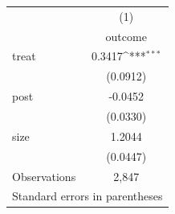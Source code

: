{
\def\sym#1{\ifmmode^{#1}\else\(^{#1}\)\fi}
\begin{tabular}{l*{1}{c}}
\toprule
                    &\multicolumn{1}{c}{(1)}\\
                    &\multicolumn{1}{c}{outcome}\\
\midrule
treat               &      0.3417\sym{***}\\
                    &    (0.0912)         \\
post                &     -0.0452         \\
                    &    (0.0330)         \\
size                &      1.2044         \\
                    &    (0.0447)         \\
Observations        &       2,847         \\
\bottomrule
\multicolumn{2}{l}{\footnotesize Standard errors in parentheses}\\
\end{tabular}
}
